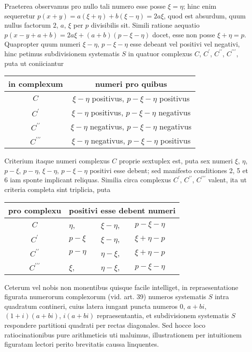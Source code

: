 \documentclass[twoside,12pt, showframe]{memoir}
\begin{document}
Praeterea observamus pro nullo tali numero esse posse \(\xi=\eta\); hinc enim sequeretur \(p(x+y)=a(\xi+\eta)+b(\xi-\eta)=2 a \xi\), quod est absurdum, quum nullus factorum \(2\), \( a\), \( \xi\) per \(p\) divisibilis sit. Simili ratione aequatio \(p(x-y+a+b)=2 a \xi+(a+b)(p-\xi-\eta)\) docet, esse non posse \(\xi+\eta=p\). Quapropter quum numeri \(\xi-\eta\), \( p-\xi-\eta\) esse debeant vel positivi vel negativi, hinc petimus subdivisionem systematis \(S\) in quatuor complexus \(C\), \( C^{\prime}\), \( C^{\prime \prime}\), \( C^{\prime \prime \prime}\), puta ut coniiciantur
\begin{center}
\begin{tabular}{c|c}
in complexum & numeri pro quibus \\
\hline
\(C\) & \(\xi-\eta\) positivus, \(p-\xi-\eta\) positivus \\
\(C^{\prime}\) & \(\xi-\eta\) positivus, \(p-\xi-\eta\) negativus \\
\(C^{\prime \prime}\) & \(\xi-\eta\) negativus, \(p-\xi-\eta\) negativus \\
\(C^{\prime \prime \prime}\) & \(\xi-\eta\) negativus, \(p-\xi-\eta\) positivus \\
\end{tabular}
\end{center}
Criterium itaque numeri complexus \(C\) proprie sextuplex est, puta sex numeri \(\xi\), \( \eta\), \( p-\xi\), \( p-\eta\), \( \xi-\eta\), \( p-\xi-\eta\) positivi esse debent; sed manifesto conditiones 2, 5 et 6 iam sponte implicant reliquas. Similia circa complexus \(C^{\prime}\), \( C^{\prime \prime}\), \(C^{\prime \prime \prime}\) valent, ita ut criteria completa sint triplicia, puta\clearpage\noindent%
\begin{center}
\begin{tabular}{c|lll}
pro complexu & \multicolumn{3}{c}{positivi esse debent numeri}   \\
\hline
\(C\) & \(\eta\), & \(\xi-\eta\), & \(p-\xi-\eta\) \\
\(C^{\prime}\) & \(p-\xi\) & \(\xi-\eta\), & \(\xi+\eta-p\)   \\
\(C^{\prime \prime}\) & \(p-\eta\)& \(\eta-\xi\), & \(\xi+\eta-p\)   \\
\(C^{\prime \prime \prime}\) & \(\xi\), & \(\eta-\xi\), & \(p-\xi-\eta\) \\
\end{tabular}
\end{center}

Ceterum vel nobis non monentibus quisque facile intelliget, in repraesentatione figurata numerorum complexorum (vid. art. 39) numeros systematis \(S\) intra quadratum contineri, cuius latera iungant puncta numeros \(0\), \(a+b i\), \((1+i)(a+b i)\), \(i(a+b i)\) repraesentantia, et subdivisionem systematis \(S\) respondere partitioni quadrati per rectas diagonales. Sed hocce loco ratiocinationibus pure arithmeticis uti maluimus, illustrationem per intuitionem figuratam lectori perito brevitatis caussa linquentes.
\end{document}
